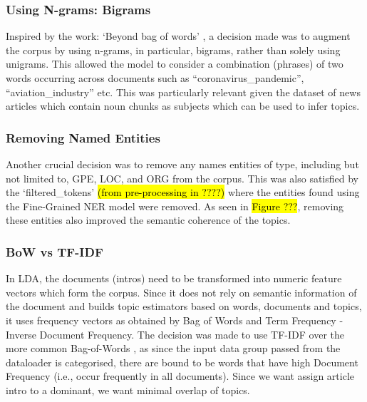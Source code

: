 
\subsubsection{Using N-grams: Bigrams}
Inspired by the work: ‘Beyond bag of words’ \cite{bigrams_lda}, a decision made was to augment the corpus by using n-grams, in particular, bigrams, rather than solely using unigrams. This allowed the model to consider a combination (phrases) of two words occurring across documents such as “coronavirus\_pandemic”, “aviation\_industry” etc. This was particularly relevant given the dataset of news articles which contain noun chunks as subjects which can be used to infer topics. 

\subsubsection{Removing Named Entities}
Another crucial decision was to remove any names entities of type, including but not limited to, GPE, LOC, and ORG from the corpus. This was also satisfied by the ‘filtered\_tokens’ \hl{(from pre-processing in ????)} where the entities found using the Fine-Grained NER model were removed. As seen in \hl{Figure ???}, removing these entities also improved the semantic coherence of the topics. 

\subsubsection{BoW vs TF-IDF}
In LDA, the documents (intros) need to be transformed into numeric feature vectors which form the corpus. Since it does not rely on semantic information of the document and builds topic estimators based on words, documents and topics, it uses frequency vectors as obtained by Bag of Words and Term Frequency - Inverse Document Frequency. The decision was made to use TF-IDF over the more common Bag-of-Words \cite{topic_models}, as since the input data group passed from the dataloader is categorised, there are bound to be  words that have high Document Frequency (i.e., occur frequently in all documents). Since we want assign article intro to a dominant, we want minimal overlap of topics.

